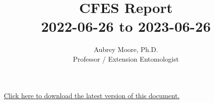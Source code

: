 \usepackage[sorting=none, maxbibnames=99]{biblatex}





\usepackage[breaklinks=true, colorlinks=True, allcolors=blue]{hyperref}

\usepackage{indentfirst} 
\usepackage{comment}

\newcommand{\activities}{\medskip\textbf{Activities}}
\newcommand{\plans}{\medskip\textbf{Plans}}

\makeatletter

\makeatother






\title{CFES Report\\2022-06-26 to 2023-06-26}

\author{Aubrey Moore, Ph.D.\\
Professor / Extension Entomologist}

\maketitle

\begin{center}
	\href{https://aubreymoore.github.io/CFES2020-22/CFES2023.pdf}{Click here to download the latest version of this document.}
\end{center}


